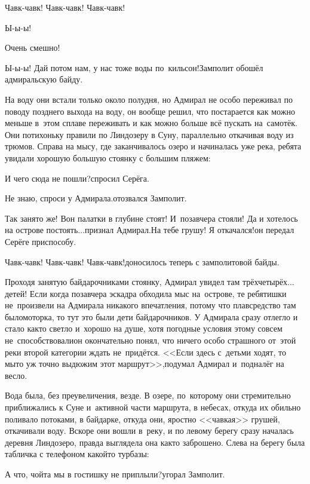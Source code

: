 \diagdash Чавк-чавк! Чавк-чавк! Чавк-чавк!

\diagdash Ы-ы-ы!

\diagdash Очень смешно!

\diagdash Ы-ы-ы! Дай потом нам, у нас тоже воды по~кильсон!\mdash Замполит обошёл адмиральскую байду.

На воду они встали только около полудня, но Адмирал не особо переживал по поводу позднего выхода на воду, он вообще решил, что постарается как можно меньше в~этом сплаве переживать и как можно больше всё пускать на~самотёк. Они потихоньку правили по Линдозеру в Суну, параллельно откачивая воду из трюмов. Справа на мысу, где заканчивалось озеро и начиналась уже река, ребята увидали хорошую большую стоянку с большим пляжем:

\diagdash И чего сюда не пошли?\mdash спросил Серёга.

\diagdash Не знаю, спроси у Адмирала.\mdash отозвался Замполит.

\diagdash Так занято же! Вон палатки в глубине стоят! И~позавчера стояли! Да и хотелось на острове постоять$\ldots$\mdash признал Адмирал.\mdash На тебе грушу! Я откачался!\mdash он передал Серёге приспособу.

\diagdash Чавк-чавк! Чавк-чавк! Чавк-чавк!\mdash доносилось теперь с замполитовой байды.

Проходя занятую байдарочниками стоянку, Адмирал увидел там трёх\sdash четырёх$\ldots$ детей! Если когда позавчера эскадра обходила мыс на~острове, те ребятишки не~произвели на Адмирала никакого впечатления, потому что плавсредство там было\mdash моторка, то тут это были дети байдарочников. У Адмирала сразу отлегло и стало как\sdash то светло и~хорошо на душе, хотя погодные условия этому совсем не~способствовали\mdash он окончательно понял, что ничего особо страшного от~этой реки второй категории ждать не~придётся. <<Если здесь с~детьми ходят, то мы\mdash то уж точно выдюжим этот маршрут>>,\mdash подумал Адмирал и~подналёг на весло.

Вода была, без преувеличения, везде. В озере, по~которому они стремительно приближались к Суне и~активной части маршрута, в небесах, откуда их обильно поливало потоками, в байдарке, откуда они, яростно <<чавкая>> грушей, откачивали воду. Вскоре они вошли в~реку, и по левому берегу сразу началась деревня Линдозеро, правда выглядела она как\sdash то заброшено. Слева на берегу была табличка с телефоном какой\sdash то турбазы:

\diagdash А что, чойта мы в гостишку не приплыли?\mdash угорал Замполит.

